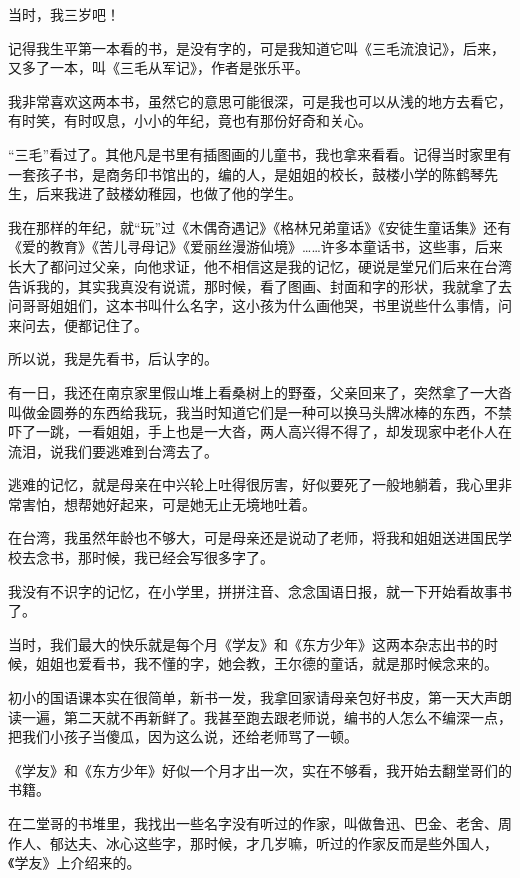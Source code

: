 \par 当时，我三岁吧！
\par 记得我生平第一本看的书，是没有字的，可是我知道它叫《三毛流浪记》，后来，又多了一本，叫《三毛从军记》，作者是张乐平。
\par 我非常喜欢这两本书，虽然它的意思可能很深，可是我也可以从浅的地方去看它，有时笑，有时叹息，小小的年纪，竟也有那份好奇和关心。
\par “三毛”看过了。其他凡是书里有插图画的儿童书，我也拿来看看。记得当时家里有一套孩子书，是商务印书馆出的，编的人，是姐姐的校长，鼓楼小学的陈鹤琴先生，后来我进了鼓楼幼稚园，也做了他的学生。
\par 我在那样的年纪，就“玩”过《木偶奇遇记》《格林兄弟童话》《安徒生童话集》还有《爱的教育》《苦儿寻母记》《爱丽丝漫游仙境》……许多本童话书，这些事，后来长大了都问过父亲，向他求证，他不相信这是我的记忆，硬说是堂兄们后来在台湾告诉我的，其实我真没有说谎，那时候，看了图画、封面和字的形状，我就拿了去问哥哥姐姐们，这本书叫什么名字，这小孩为什么画他哭，书里说些什么事情，问来问去，便都记住了。
\par 所以说，我是先看书，后认字的。
\par 有一日，我还在南京家里假山堆上看桑树上的野蚕，父亲回来了，突然拿了一大沓叫做金圆券的东西给我玩，我当时知道它们是一种可以换马头牌冰棒的东西，不禁吓了一跳，一看姐姐，手上也是一大沓，两人高兴得不得了，却发现家中老仆人在流泪，说我们要逃难到台湾去了。
\par 逃难的记忆，就是母亲在中兴轮上吐得很厉害，好似要死了一般地躺着，我心里非常害怕，想帮她好起来，可是她无止无境地吐着。
\par 在台湾，我虽然年龄也不够大，可是母亲还是说动了老师，将我和姐姐送进国民学校去念书，那时候，我已经会写很多字了。
\par 我没有不识字的记忆，在小学里，拼拼注音、念念国语日报，就一下开始看故事书了。
\par 当时，我们最大的快乐就是每个月《学友》和《东方少年》这两本杂志出书的时候，姐姐也爱看书，我不懂的字，她会教，王尔德的童话，就是那时候念来的。
\par 初小的国语课本实在很简单，新书一发，我拿回家请母亲包好书皮，第一天大声朗读一遍，第二天就不再新鲜了。我甚至跑去跟老师说，编书的人怎么不编深一点，把我们小孩子当傻瓜，因为这么说，还给老师骂了一顿。
\par 《学友》和《东方少年》好似一个月才出一次，实在不够看，我开始去翻堂哥们的书籍。
\par 在二堂哥的书堆里，我找出一些名字没有听过的作家，叫做鲁迅、巴金、老舍、周作人、郁达夫、冰心这些字，那时候，才几岁嘛，听过的作家反而是些外国人，《学友》上介绍来的。
